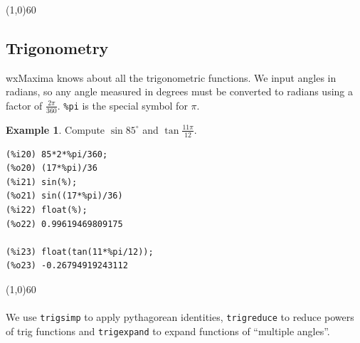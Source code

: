 \documentclass[10.5pt,twoside]{report}
\theoremstyle{definition}
\newtheorem{exmp}{Example}[section]
\begin{document}
\line(1,0){60}
\linethickness{0.5mm}
${}$\\

\subsection{Trigonometry}

wxMaxima knows about all the trigonometric functions.  We input angles in radians, so any angle measured in degrees must be converted to radians using a factor of $\frac{2\pi}{360}$.  \verb|%pi| is the special symbol for $\pi$.

\begin{exmp} Compute $\sin{85^\circ}$ and $\tan{\frac{11\pi}{12}}$.\\


\begin{verbatim}
(%i20) 85*2*%pi/360;
(%o20) (17*%pi)/36
(%i21) sin(%);
(%o21) sin((17*%pi)/36)
(%i22) float(%);
(%o22) 0.99619469809175

(%i23) float(tan(11*%pi/12));
(%o23) -0.26794919243112
\end{verbatim}

\end{exmp}

\line(1,0){60}
\linethickness{0.5mm}
${}$\\
${}$\\

We use \verb|trigsimp| to apply pythagorean identities, \verb|trigreduce| to reduce powers of trig functions and \verb|trigexpand| to expand functions of ``multiple angles''.\\
\end{document}
